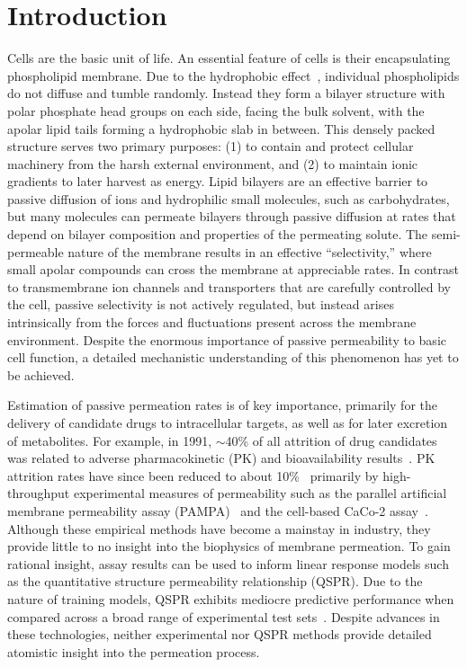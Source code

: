 %  
\section*{Introduction}
\par Cells are the basic unit of life. An essential feature of cells is their encapsulating phospholipid membrane. Due to the hydrophobic effect~\cite{Tanford1979,Tanford1973}, individual phospholipids do not diffuse and tumble randomly.  Instead they form a bilayer structure with polar phosphate head groups on each side, facing the bulk solvent, with the apolar lipid tails forming a hydrophobic slab in between. This densely packed structure serves two primary purposes: (1) to contain and protect cellular machinery from the harsh external environment, and (2) to maintain ionic gradients to later harvest as energy. Lipid bilayers are an effective barrier to passive diffusion of ions and hydrophilic small molecules, such as carbohydrates, but many molecules can permeate bilayers through passive diffusion at rates that depend on bilayer composition and properties of the permeating solute. The semi-permeable nature of the membrane results in an effective ``selectivity,'' where small apolar compounds can cross the membrane at appreciable rates. In contrast to transmembrane ion channels and transporters that are carefully controlled by the cell, passive selectivity is not actively regulated, but instead arises intrinsically from the forces and fluctuations present across the membrane environment. Despite the enormous importance of passive permeability to basic cell function, a detailed mechanistic understanding of this phenomenon has yet to be achieved.
    
\par Estimation of passive permeation rates is of key importance, primarily for the delivery of candidate drugs to intracellular targets, as well as for later excretion of metabolites. For example, in 1991, $\sim$40\% of all  attrition of  drug candidates was related to adverse pharmacokinetic (PK) and bioavailability results~\cite{Kola2004}. PK attrition rates have since been reduced to about 10\%~\cite{Tsaioun2009} primarily by high-throughput experimental measures of permeability such as the parallel artificial membrane permeability assay (PAMPA)~\cite{Kansy1998,Avdeef2005} and the cell-based CaCo-2 assay~\cite{Artursson2001,VanBreemen2005}. Although these empirical methods have become a mainstay in industry, they provide little to no insight into the biophysics of membrane permeation. To gain rational insight, assay results can be used to inform linear response models such as the quantitative structure permeability relationship (QSPR)\cite{Hansch1972,Hansch1969}. Due to the nature of training models, QSPR exhibits mediocre predictive performance when compared across a broad range of experimental test sets~\cite{Stouch2003,Swift2013}. Despite advances in these technologies, neither experimental nor QSPR methods provide detailed atomistic insight into the permeation process.

